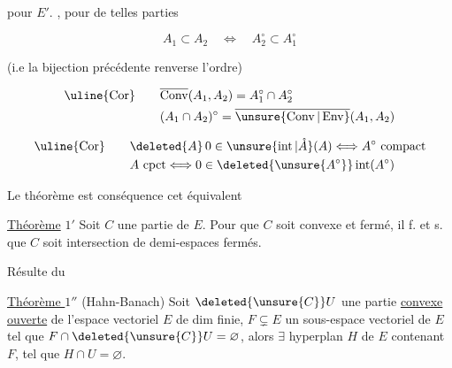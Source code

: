 
pour $E'$.  , pour de telles parties

\[
 A_1\subset A_2\quad\Longleftrightarrow\quad A_2^{\circ}\subset A_1^\circ
\]

(i.e la bijection précédente renverse l'ordre)

\[
\begin{aligned}
\text{\uline{Cor}}\qquad &\overline{\operatorname{Conv}}(A_1,A_2)=A_1^\circ\cap A_2^\circ\\
&(A_1\cap A_2)^\circ=\overline{\unsure{\operatorname{Conv}|\operatorname{Env}}}(A_1,A_2)
\end{aligned}
\]

\[
\begin{aligned}
\text{\uline{Cor}}\qquad &\deleted{A}\,0\in\unsure{\operatorname{int}|\mathring A}(A)\Longleftrightarrow A^\circ\ \text{compact}\\
&A\ \text{cpct}\Longleftrightarrow 0\in\deleted{\unsure{A^\circ}}\operatorname{int}(A^\circ)
\end{aligned}
\]

 Le théorème est conséquence  cet  équivalent


\uline{Théorème} $1'$ Soit $C$ une partie de $E$. Pour que $C$ soit convexe et fermé, il f. et s. que $C$ soit intersection de demi-espaces fermés.

Résulte du

\uline{Théorème $1''$} (Hahn-Banach) Soit $\deleted{\unsure{C}}U$ une partie \uline{convexe ouverte} de l'espace vectoriel  $E$ de dim finie, $F\subsetneq E$ un sous-espace vectoriel de $E$ tel que $F\cap\deleted{\unsure{C}}U=\varnothing$, alors $\exists$ hyperplan $H$ de $E$ contenant $F$, tel que $H\cap U=\varnothing$.
